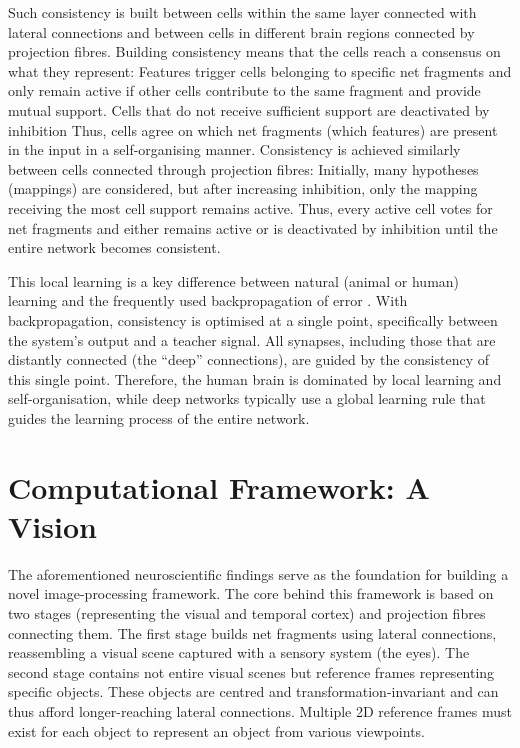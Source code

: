 Such consistency is built between cells within the same layer connected with lateral connections and between cells in different brain regions connected by projection fibres.
Building consistency means that the cells reach a consensus on what they represent: Features trigger cells belonging to specific net fragments and only remain active if other cells contribute to the same fragment and provide mutual support. Cells that do not receive sufficient support are deactivated by inhibition 
Thus, cells agree on which net fragments (which features) are present in the input in a self-organising manner.
Consistency is achieved similarly between cells connected through projection fibres: Initially, many hypotheses (mappings) are considered, but after increasing inhibition, only the mapping receiving the most cell support remains active.
Thus, every active cell votes for net fragments and either remains active or is deactivated by inhibition until the entire network becomes consistent.

This local learning is a key difference between natural (animal or human) learning and the frequently used backpropagation of error . With backpropagation, consistency is optimised at a single point, specifically between the system's output and a teacher signal. All synapses, including those that are distantly connected (the ``deep'' connections), are guided by the consistency of this single point. Therefore, the human brain is dominated by local learning and self-organisation, while deep networks typically use a global learning rule that guides the learning process of the entire network.


\section{Computational Framework: A Vision}
The aforementioned neuroscientific findings serve as the foundation for building a novel image-processing framework.
The core behind this framework is based on two stages (representing the visual and temporal cortex) and projection fibres connecting them.
The first stage builds net fragments using lateral connections, reassembling a visual scene captured with a sensory system (the eyes).
The second stage contains not entire visual scenes but reference frames representing specific objects. These objects are centred and transformation-invariant and can thus afford longer-reaching lateral connections.
Multiple 2D reference frames must exist for each object to represent an object from various viewpoints.

